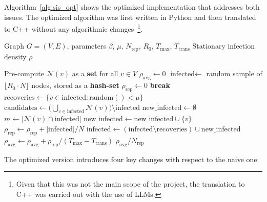 \documentclass{article}
\begin{document}
Algorithm~\ref{alg:sis_opt} shows the optimized implementation that addresses both issues. The optimized algorithm was first written in Python and then translated to C++ without any algorithmic changes~\footnote{Given that this was not the main scope of the project, the translation to C++ was carried out with the use of LLMs.}.

\begin{algorithm}[ht]
\caption{SIS Monte Carlo simulation (optimized)}
\label{alg:sis_opt}
\begin{algorithmic}[1]
\Require Graph $G=(V,E)$, parameters $\beta$, $\mu$, $N_{\text{rep}}$,
         $R_0$, $T_{\max}$, $T_{\text{trans}}$
\Ensure  Stationary infection density $\rho$

\State Pre-compute $\mathcal{N}(v)$ as a \textbf{set} for all $v \in V$ 
\State $\rho_{\text{avg}} \gets 0$
    \State $\text{infected} \gets $ random sample of $\lfloor R_0 \cdot N \rfloor$ nodes, stored as a \textbf{hash-set}
    \State $\rho_{\text{rep}} \gets 0$
         \textbf{break} \EndIf
        \State $\text{recoveries} \gets \{v \in \text{infected} : \text{random}() < \mu\}$
        \State $\text{candidates} \gets \bigl(\bigcup_{v \in \text{infected}} \mathcal{N}(v)\bigr) \setminus \text{infected}$
        \State $\text{new\_infected} \gets \emptyset$
            \State $m \gets |\mathcal{N}(v) \cap \text{infected}|$ 
                \State $\text{new\_infected} \gets \text{new\_infected} \cup \{v\}$
            \EndIf
        \EndFor
            \State $\rho_{\text{rep}} \gets \rho_{\text{rep}} + |\text{infected}| / N$
        \EndIf
        \State $\text{infected} \gets (\text{infected} \setminus \text{recoveries}) \cup \text{new\_infected}$
    \EndFor
    \State $\rho_{\text{avg}} \gets \rho_{\text{avg}} + \rho_{\text{rep}} / (T_{\max} - T_{\text{trans}})$
\EndFor
\State \Return $\rho_{\text{avg}} / N_{\text{rep}}$
\end{algorithmic}
\end{algorithm}

The optimized version introduces four key changes with respect to the naive one:
\end{document}
